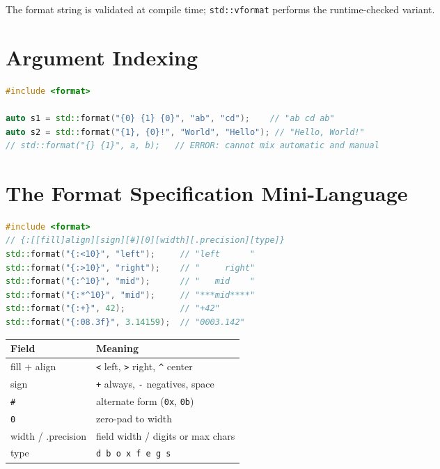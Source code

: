 The format string is validated at compile time; \texttt{std::vformat} performs the runtime-checked variant.

\section{Argument Indexing}
\label{sec:c20-format-indexing}

\begin{lstlisting}[language=C++,caption={Explicit argument indices}]
#include <format>

auto s1 = std::format("{0} {1} {0}", "ab", "cd");    // "ab cd ab"
auto s2 = std::format("{1}, {0}!", "World", "Hello"); // "Hello, World!"
// std::format("{} {1}", a, b);   // ERROR: cannot mix automatic and manual
\end{lstlisting}

\section{The Format Specification Mini-Language}
\label{sec:c20-format-spec}

\begin{lstlisting}[language=C++,caption={The anatomy of a format spec}]
#include <format>
// {:[[fill]align][sign][#][0][width][.precision][type]}
std::format("{:<10}", "left");     // "left      "
std::format("{:>10}", "right");    // "     right"
std::format("{:^10}", "mid");      // "   mid    "
std::format("{:*^10}", "mid");     // "***mid****"
std::format("{:+}", 42);           // "+42"
std::format("{:08.3f}", 3.14159);  // "0003.142"
\end{lstlisting}

\begin{center}
\begin{tabular}{ll}
\hline
\textbf{Field} & \textbf{Meaning} \\
\hline
fill + align & \texttt{<} left, \texttt{>} right, \texttt{\^} center \\
sign & \texttt{+} always, \texttt{-} negatives, space \\
\texttt{\#} & alternate form (\texttt{0x}, \texttt{0b}) \\
\texttt{0} & zero-pad to width \\
width / .precision & field width / digits or max chars \\
type & \texttt{d b o x f e g s} \\
\hline
\end{tabular}
\end{center}

